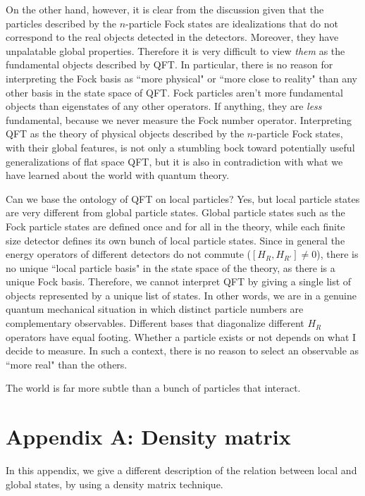 \documentclass[10pt, nofootinbib]{revtex4}
\begin{document}
On the other hand, however, it is clear from the discussion given that
the particles described by the $n$-particle Fock states are
idealizations that do not correspond to the real objects detected in
the detectors.  Moreover, they have unpalatable global properties. 
Therefore it is very difficult to view \emph{them} as the fundamental
objects described by QFT. In particular, there is no reason for
interpreting the Fock basis as ``more physical" or ``more close to
reality" than any other basis in the state space of QFT. Fock
particles aren't more fundamental objects than eigenstates of any
other operators.  If anything, they are \emph{less} fundamental,
because we never measure the Fock number operator.  Interpreting QFT
as the theory of physical objects described by the $n$-particle Fock
states, with their global features, is not only a stumbling bock
toward potentially useful generalizations of flat space QFT, but it
is also in contradiction with what we have learned about the world
with quantum theory.

Can we base the ontology of QFT on local particles?  Yes, but local
particle states are very different from global particle states. 
Global particle states such as the Fock particle states are defined
once and for all in the theory, while each finite size detector
defines its own bunch of local particle states.  Since in general the
energy operators of different detectors do not commute
($[H_{R},H_{R'}]\ne 0$), there is no unique ``local particle basis" in
the state space of the theory, as there is a unique Fock basis. 
Therefore, we cannot interpret QFT by giving a single list of objects
represented by a unique list of states.  In other words, we are in a
genuine quantum mechanical situation in which distinct particle
numbers are complementary observables.  Different bases that
diagonalize different $H_{R}$ operators have equal footing.  Whether a
particle exists or not depends on what I decide to measure.  In such a
context, there is no reason to select an observable as ``more real"
than the others.

The world is far more subtle than a bunch of particles that interact.


\vskip2cm

\appendix

\section*{Appendix A: Density matrix}

In this appendix, we give a different description of the relation
between local and global states, by using a density matrix technique. 
\end{document}
